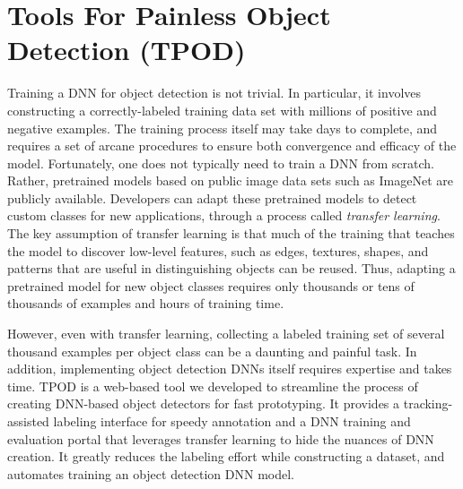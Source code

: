 \section{Tools For Painless Object Detection (TPOD)}
\label{sec: app-dev-tpod}

Training a DNN for object detection is not trivial.  In particular, it involves
constructing a correctly-labeled training data set with millions of positive and
negative examples. The training process itself may take days to complete, and
requires a set of arcane procedures to ensure both convergence and efficacy of
the model. Fortunately, one does not typically need to train a DNN from scratch.
Rather, pretrained models based on public image data sets such as ImageNet are
publicly available. Developers can adapt these pretrained models to detect
custom classes for new applications, through a process called \emph{transfer
learning}.  The key assumption of transfer learning is that much of the training
that teaches the model to discover low-level features, such as edges, textures,
shapes, and patterns that are useful in distinguishing objects can be reused.
Thus, adapting a pretrained model for new object classes requires only thousands
or tens of thousands of examples and hours of training time. 

However, even with transfer learning, collecting a labeled training set of
several thousand examples per object class can be a daunting and painful task.
In addition, implementing object detection DNNs itself requires expertise and
takes time. TPOD is a web-based tool we developed to streamline the process of
creating DNN-based object detectors for fast prototyping. It provides a
tracking-assisted labeling interface for speedy annotation and a DNN training
and evaluation portal that leverages transfer learning to hide the nuances of
DNN creation. It greatly reduces the labeling effort while constructing a
dataset, and automates training an object detection DNN model.


